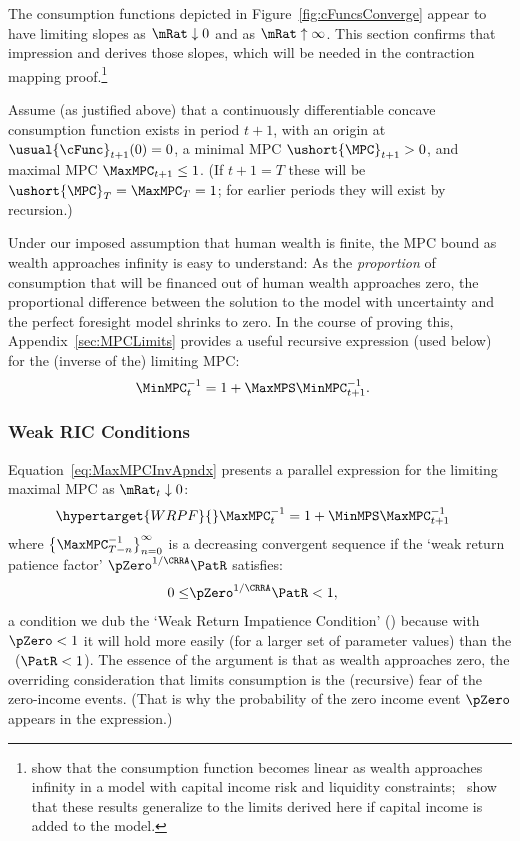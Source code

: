 \documentclass[BufferStockTheory]{subfiles}
\begin{document}
The consumption functions depicted in Figure~\ref{fig:cFuncsConverge} appear to have limiting slopes as $\mRat \downarrow 0$ and as $\mRat \uparrow \infty$.  This section confirms that impression and derives those slopes, which will be needed in the contraction mapping proof.\footnote{\cite{benhabibWealth} show that the consumption function becomes linear as wealth approaches infinity in a model with capital income risk and liquidity constraints;~\cite{maTodaRich} show that these results generalize to the limits derived here if capital income is added to the model.}

\newcommand{\NewMaxMinMPC}{\ushort{\MPC}}

Assume (as justified above) that a continuously differentiable concave consumption function exists in period $t+1$, with an origin at $\usual{\cFunc}_{t+1}(0)=0$, a minimal MPC $\NewMaxMinMPC_{t+1}>0$, and maximal MPC $\MaxMPC_{t+1} \leq 1$.  (If $t+1 = T$ these will be $\NewMaxMinMPC_{T}=\MaxMPC_{T}=1$; for earlier periods they will exist by recursion.)

Under our imposed assumption that human wealth is finite, the MPC bound as wealth approaches infinity is easy to understand:  As the \textit{proportion} of consumption that will be financed out of human wealth approaches zero, the proportional difference between the solution to the model with uncertainty and the perfect foresight model shrinks to zero.  \hypertarget{MPCnvrsLower}{} In the course of proving this, Appendix~\ref{sec:MPCLimits} provides a useful recursive expression (used below) for the (inverse of the) limiting MPC:\hypertarget{WRICCond}{}
\begin{align}
  \MinMPC_{t}^{-1}  & = 1+\MaxMPS \MinMPC_{t+1}^{-1} \label{eq:MinMPCInv}.
\end{align}
\subsubsection{Weak RIC Conditions}{}\label{sec:WRIC}
\hypertarget{MPCnvrsUpper}{}
\hypertarget{WRIC}{}
Equation~\eqref{eq:MaxMPCInvApndx} presents a parallel expression for the limiting maximal MPC as $\mRat_{t} \downarrow 0$:
\begin{align}\hypertarget{WRPF}{}
  \MaxMPC_{t}^{-1}  & = 1+\MinMPS \MaxMPC_{t+1}^{-1} \label{eq:MaxMPCInv}
\end{align}
where $\left\{\MaxMPC_{T-n}^{-1}\right\} _{n=0}^{\infty}$ is a decreasing %
convergent sequence if the `weak return patience factor' $\pZero^{1/\CRRA}\PatR$ satisfies:
\begin{align}
  0 \leq & \pZero^{1/\CRRA} \PatR < 1 \label{eq:WRIC},
\end{align}
a condition we dub the `Weak Return Impatience Condition' (\WRIC) because with $\pZero < 1$ it will hold more easily (for a larger set of parameter values) than the \RIC~($\PatR < 1$).  The essence of the argument is that as wealth approaches zero, the overriding consideration that limits consumption is the (recursive) fear of the zero-income events.  (That is why the probability of the zero income event $\pZero$ appears in the expression.)
\end{document}
